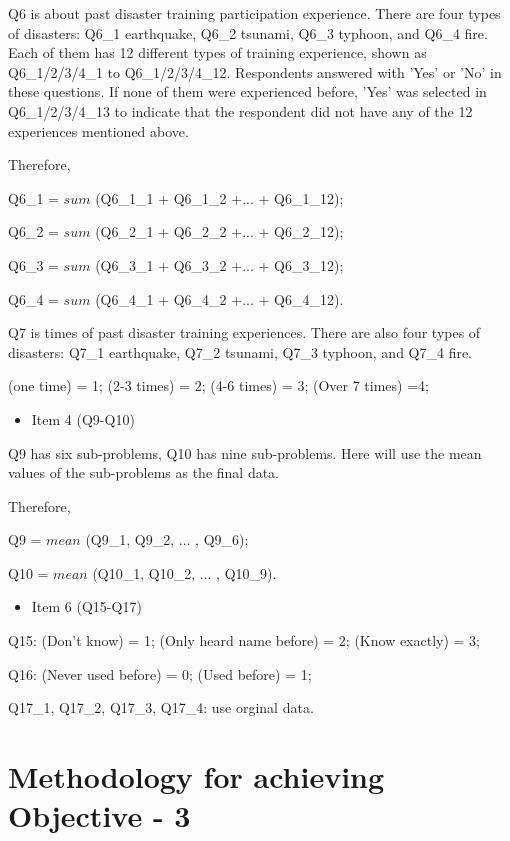 Q6 is about past disaster training participation experience. There are four types of disasters: Q6\_1 earthquake, Q6\_2 tsunami, Q6\_3 typhoon, and Q6\_4 fire. Each of them has 12 different types of training experience, shown as Q6\_1/2/3/4\_1 to Q6\_1/2/3/4\_12. Respondents answered with 'Yes' or 'No' in these questions. If none of them were experienced before, 'Yes' was selected in Q6\_1/2/3/4\_13 to indicate that the respondent did not have any of the 12 experiences mentioned above. 

Therefore, 

Q6\_1 = $sum$ (Q6\_1\_1 + Q6\_1\_2 +... + Q6\_1\_12);

Q6\_2 = $sum$ (Q6\_2\_1 + Q6\_2\_2 +... + Q6\_2\_12);

Q6\_3 = $sum$ (Q6\_3\_1 + Q6\_3\_2 +... + Q6\_3\_12);

Q6\_4 = $sum$ (Q6\_4\_1 + Q6\_4\_2 +... + Q6\_4\_12).

Q7 is times of past disaster training experiences. There are also four types of disasters: Q7\_1 earthquake, Q7\_2 tsunami, Q7\_3 typhoon, and Q7\_4 fire.
 
(one time) = 1; (2-3 times) = 2; (4-6 times) = 3; (Over 7 times) =4;

\begin{itemize}
\item Item 4 (Q9-Q10)
\end{itemize}

Q9 has six sub-problems, Q10 has nine sub-problems. Here will use the mean values of the sub-problems as the final data. 

Therefore, 

Q9 = $mean$ (Q9\_1, Q9\_2, ... , Q9\_6);

Q10 = $mean$ (Q10\_1, Q10\_2, ... , Q10\_9).

\begin{itemize}
\item Item 6 (Q15-Q17)
\end{itemize}

Q15: (Don't know) = 1; (Only heard name before) = 2; (Know exactly) = 3;

Q16: (Never used before) = 0; (Used before) = 1;
 
Q17\_1, Q17\_2, Q17\_3, Q17\_4: use orginal data.


\section{Methodology for achieving Objective - 3}

